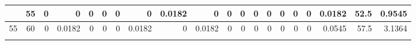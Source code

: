 \begin{table}[ht]
\begin{adjustbox}{width = \textwidth, center}
\begin{tabular}{|cc|r|r|r|r|r|r|r|r|r|r|r|r|r|r|r|rrr|}
        \cellcolor[HTML]{C8E4BE}\enskip 50 \enskip            & \cellcolor[HTML]{D9EAD3}55          & 0                                              & 0                                              & 0                                              & 0                                              & 0                                              & 0                                              & \cellcolor[HTML]{C7E9D8}0.0182                 & 0                                               & 0                                               & 0                                               & 0                                               & 0                                               & 0                                               & 0                                               & 0                                               & \multicolumn{1}{r|}{\cellcolor[HTML]{D9D2E9}0.0182}                                   & \multicolumn{1}{r|}{\cellcolor[HTML]{D9D2E9}52.5}                       & \cellcolor[HTML]{D9D2E9}0.9545                                                              \\ \hline
        \rowcolor[HTML]{FFFFFF} 
        \cellcolor[HTML]{C8E4BE}55           & \cellcolor[HTML]{D9EAD3}60          & 0                                              & \cellcolor[HTML]{C7E9D8}0.0182                 & 0                                              & 0                                              & 0                                              & \cellcolor[HTML]{C7E9D8}0.0182                 & 0                                              & \cellcolor[HTML]{C7E9D8}0.0182                  & 0                                               & 0                                               & 0                                               & 0                                               & 0                                               & 0                                               & 0                                               & \multicolumn{1}{r|}{\cellcolor[HTML]{D9D2E9}0.0545}                                   & \multicolumn{1}{r|}{\cellcolor[HTML]{D9D2E9}57.5}                       & \cellcolor[HTML]{D9D2E9}3.1364                                                              \\ \hline
        \rowcolor[HTML]{FFFFFF} 

\end{tabular}
\end{adjustbox}
\end{table}
